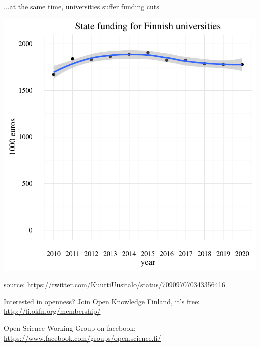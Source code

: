 \documentclass{beamer}
\begin{document}
\begin{frame}{...at the same time, universities suffer funding cuts}
  \begin{center}
    \includegraphics[height=0.8\textheight]{unifund.pdf}
  \end{center}
  
  \tiny{source: \url{https://twitter.com/KuuttiUusitalo/status/709097070343356416}}
\end{frame}

\begin{frame}{Interested in openness?}
  Join Open Knowledge Finland, it's free: \url{http://fi.okfn.org/membership/}
  
  Open Science Working Group on facebook: \url{https://www.facebook.com/groups/open.science.fi/}
\end{frame}
\end{document}
